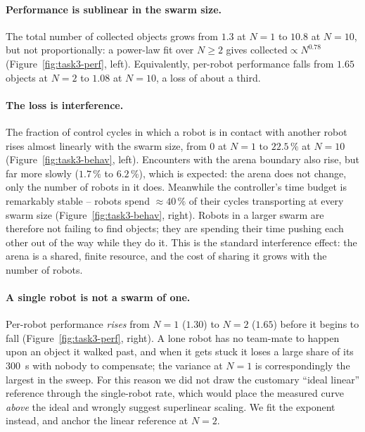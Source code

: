 \documentclass[12pt, a4paper]{article}
\begin{document}
\paragraph{Performance is sublinear in the swarm size.}
The total number of collected objects grows from $1.3$ at $N = 1$ to $10.8$ at
$N = 10$, but not proportionally: a power-law fit over $N \ge 2$ gives
$\text{collected} \propto N^{0.78}$ (Figure~\ref{fig:task3-perf}, left).
Equivalently, per-robot performance falls from $1.65$ objects at $N = 2$ to
$1.08$ at $N = 10$, a loss of about a third.

\paragraph{The loss is interference.}
The fraction of control cycles in which a robot is in contact with another robot
rises almost linearly with the swarm size, from $0$ at $N = 1$ to $22.5\,\%$ at
$N = 10$ (Figure~\ref{fig:task3-behav}, left).  Encounters with the arena
boundary also rise, but far more slowly ($1.7\,\%$ to $6.2\,\%$), which is
expected: the arena does not change, only the number of robots in it does.
Meanwhile the controller's time budget is remarkably stable -- robots spend
${\approx}40\,\%$ of their cycles transporting at every swarm size
(Figure~\ref{fig:task3-behav}, right).  Robots in a larger swarm are therefore
not failing to find objects; they are spending their time pushing each other out
of the way while they do it.  This is the standard interference effect: the
arena is a shared, finite resource, and the cost of sharing it grows with the
number of robots.

\paragraph{A single robot is not a swarm of one.}
Per-robot performance \emph{rises} from $N = 1$ ($1.30$) to $N = 2$ ($1.65$)
before it begins to fall (Figure~\ref{fig:task3-perf}, right).  A lone robot has
no team-mate to happen upon an object it walked past, and when it gets stuck it
loses a large share of its $300$~s with nobody to compensate; the variance at
$N = 1$ is correspondingly the largest in the sweep.  For this reason we did not
draw the customary ``ideal linear'' reference through the single-robot rate,
which would place the measured curve \emph{above} the ideal and wrongly suggest
superlinear scaling.  We fit the exponent instead, and anchor the linear
reference at $N = 2$.
\end{document}
